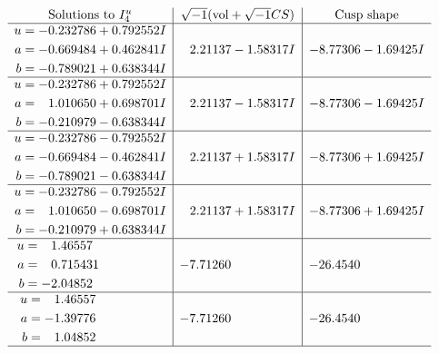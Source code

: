 \documentclass[1p]{elsarticle_modified}
\theoremstyle{definition}
\newcommand{\I}{\sqrt{-1}}
\begin{document}
$$\begin{array}{c|c|c}  
\text{Solutions to }I^u_{4}& \I (\text{vol} + \sqrt{-1}CS) & \text{Cusp shape}\\
 \hline 
\begin{aligned}
u &= -0.232786 + 0.792552 I \\
a &= -0.669484 + 0.462841 I \\
b &= -0.789021 + 0.638344 I\end{aligned}
 & \phantom{-}2.21137 - 1.58317 I & -8.77306 - 1.69425 I \\ \hline\begin{aligned}
u &= -0.232786 + 0.792552 I \\
a &= \phantom{-}1.010650 + 0.698701 I \\
b &= -0.210979 - 0.638344 I\end{aligned}
 & \phantom{-}2.21137 - 1.58317 I & -8.77306 - 1.69425 I \\ \hline\begin{aligned}
u &= -0.232786 - 0.792552 I \\
a &= -0.669484 - 0.462841 I \\
b &= -0.789021 - 0.638344 I\end{aligned}
 & \phantom{-}2.21137 + 1.58317 I & -8.77306 + 1.69425 I \\ \hline\begin{aligned}
u &= -0.232786 - 0.792552 I \\
a &= \phantom{-}1.010650 - 0.698701 I \\
b &= -0.210979 + 0.638344 I\end{aligned}
 & \phantom{-}2.21137 + 1.58317 I & -8.77306 + 1.69425 I \\ \hline\begin{aligned}
u &= \phantom{-}1.46557\phantom{ +0.000000I} \\
a &= \phantom{-}0.715431\phantom{ +0.000000I} \\
b &= -2.04852\phantom{ +0.000000I}\end{aligned}
 & -7.71260\phantom{ +0.000000I} & -26.4540\phantom{ +0.000000I} \\ \hline\begin{aligned}
u &= \phantom{-}1.46557\phantom{ +0.000000I} \\
a &= -1.39776\phantom{ +0.000000I} \\
b &= \phantom{-}1.04852\phantom{ +0.000000I}\end{aligned}
 & -7.71260\phantom{ +0.000000I} & -26.4540\phantom{ +0.000000I}\\
 \hline 
 \end{array}$$\newpage\newpage\renewcommand{\arraystretch}{1}
\end{document}
